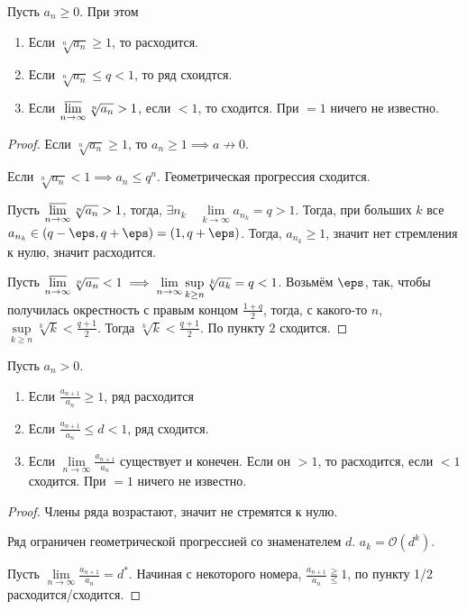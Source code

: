 \begin{theorem} \thmslashn

    Пусть $a_{n} \ge 0$. При этом
    \begin{enumerate}
        \item Если $\sqrt[n]{a_{n}} \ge 1$, то расходится.
        \item Если $\sqrt[n]{a_{n}} \le q < 1 $, то ряд схоидтся.
        \item Если $\varlimsup\limits_{n \to \infty} \sqrt[n]{a_{n}} > 1$, если $<1$, то сходится. При $=1$ ничего не известно.
    \end{enumerate}
    \begin{proof} \thmslashn
    
        Если $\sqrt[n]{a_{n}} \ge 1 $, то $a_{n} \ge 1 \implies a \not\to 0$.

        Если $\sqrt[n]{a_{n}} < 1 \implies a_{n} \le q^{n} $. Геометрическая прогрессия сходится.

        Пусть $\varlimsup\limits_{n \to \infty} \sqrt[n]{a_{n}} > 1$, тогда, $\exists{n_{k}}\quad \lim\limits_{k \to \infty} a_{n_{k}} = q > 1$. Тогда, при больших $k$ все $a_{n_{k}}\in (q-\eps, q+\eps) = (1, q+\eps)$. Тогда, $a_{n_{k}} \ge 1$, значит нет стремления к нулю, значит расходится.

        Пусть $\varlimsup\limits_{n \to \infty} \sqrt[n]{a_{n}} < 1 \implies \lim\limits_{n \to \infty}  \sup\limits_{k \ge n} \sqrt[k]{a_{k}} = q < 1 $. Возьмём $\eps$, так, чтобы получилась окрестность с правым концом $\frac{1+q}{2}$, тогда, с какого-то $n$, $\sup\limits_{k \ge  n} \sqrt[k]{k} < \frac{q+1}{2}$. Тогда $\sqrt[k]{k} < \frac{q+1}{2} $. По пункту $2$ сходится.
    \end{proof}
\end{theorem}
\begin{theorem} \thmslashn

    Пусть $a_{n} > 0$.

    \begin{enumerate}
        \item Если $\frac{a_{n+1}}{a_{n}} \ge 1$, ряд расходится
        \item Если $\frac{a_{n+1}}{a_{n}} \le d < 1$, ряд сходится.
        \item Если $\lim\limits_{n \to \infty} \frac{a_{n+1}}{a_{n}}$ существует и конечен. Если он $ >1$, то расходится, если $<1$ сходится. При $=1$ ничего не известно.
    \end{enumerate}
    \begin{proof} \thmslashn
    
        Члены ряда возрастают, значит не стремятся к нулю.

        Ряд ограничен геометрической прогрессией со знаменателем $d$. $a_{k} = \mathcal{O}(d^{k})$.

        Пусть $\lim\limits_{n \to \infty} \frac{a_{n+1}}{a_{n}} = d^{*}$. Начиная с некоторого номера, $\frac{a_{n+1}}{a_{n}}  \frac{\ge }{\le } 1$, по пункту 1/2 расходится/сходится.
    \end{proof}
\end{theorem}
